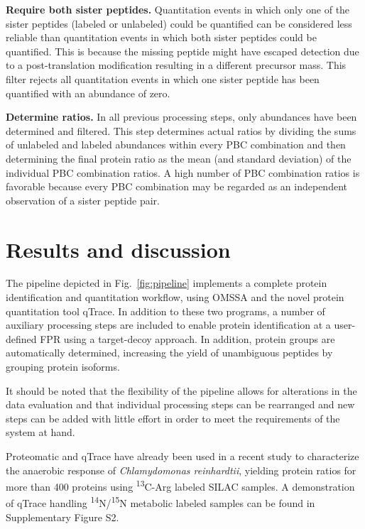 {\bf Require both sister peptides.}
Quantitation events in which only one of the sister peptides (labeled or 
unlabeled) could be quantified can be considered less reliable than quantitation 
events in which both sister peptides could be quantified.
This is because the missing peptide might have escaped detection due to a 
post-translation modification resulting in a different precursor mass. 
This filter rejects all quantitation events in which one sister peptide has 
been quantified with an abundance of zero.

{\bf Determine ratios.}
In all previous processing steps, only abundances have been determined and 
filtered. 
This step determines actual ratios by dividing the sums of unlabeled and 
labeled abundances within every PBC combination and then determining the final 
protein ratio as the mean (and standard deviation) of the individual PBC 
combination ratios.
A high number of PBC combination ratios is favorable because every PBC 
combination may be regarded as an independent observation of a sister peptide 
pair.

\section{Results and discussion}

The pipeline depicted in Fig.~\ref{fig:pipeline} implements a complete 
protein identification and quantitation workflow, using OMSSA and the novel 
protein quantitation tool qTrace. 
In addition to these two programs, a number of auxiliary processing steps are
included to enable protein identification at a user-defined FPR using a 
target-decoy approach.
In addition, protein groups are automatically determined, increasing the yield of 
unambiguous peptides by grouping protein isoforms.

It should be noted that the flexibility of the pipeline allows for alterations 
in the data evaluation and that individual processing steps can be rearranged 
and new steps can be added with little effort in order to meet the requirements 
of the system at hand.

Proteomatic and qTrace have already been used in a recent study 
\cite[]{terashima_characterizing_2010} to characterize the anaerobic 
response of {\em Chlamydomonas reinhardtii}, yielding protein ratios for more
than 400 proteins using \textsuperscript{13}C-Arg labeled SILAC samples. 
A demonstration of qTrace handling \textsuperscript{14}N/\textsuperscript{15}N 
metabolic labeled samples can be found in Supplementary Figure S2.

